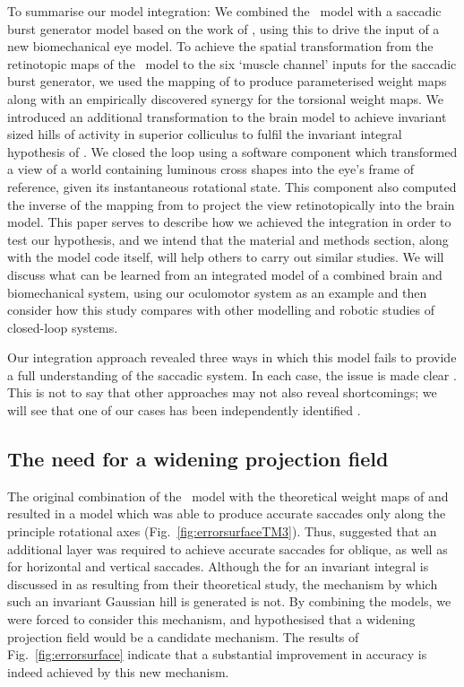 \documentclass{frontiersSCNS}
\begin{document}
To summarise our model integration: We combined
the \ccg~model \citep{cope_basal_2017} with a saccadic burst generator
model based on the work of \cite{gancarz_neural_1998}, using this to
drive the input of a new biomechanical eye model. To achieve the
spatial transformation from the retinotopic maps of the \ccg~model to
the six `muscle channel' inputs for the saccadic burst generator, we
used the mapping of \cite{ottes_visuomotor_1986} to produce
parameterised weight maps along with an empirically discovered synergy
for the torsional weight maps. We introduced an additional
transformation to the brain model to achieve invariant sized hills of
activity in superior colliculus to fulfil the invariant integral
hypothesis of \cite{tabareau_geometry_2007}. We closed the loop using
a software component which transformed a view of a world containing
luminous cross shapes into the eye's frame of reference, given its
instantaneous rotational state. This component also computed the
inverse of the mapping from \cite{ottes_visuomotor_1986} to project
the view retinotopically into the brain model.
%
This paper serves to describe how we achieved the integration in order
to test our hypothesis, and we intend that the material and methods
section, along with the model code itself, will help others to carry
out similar studies. We will discuss what can be learned from an
integrated model of a combined brain and biomechanical system, using
our oculomotor system as an example and then consider how this study
compares with other modelling and robotic studies of closed-loop
systems.

Our integration approach revealed three ways in which this model fails
to provide a full understanding of the saccadic system. In each case,
the issue is made clear . This is
not to say that other approaches may not also reveal shortcomings; we
will see that one of our cases has been independently identified
\citep{groh_effects_2011}.

\subsection{The need for a widening projection field}

The original combination of the \ccg~model with the theoretical weight
maps of \cite{ottes_visuomotor_1986} and \cite{tabareau_geometry_2007}
resulted in a model which was able to produce accurate saccades only
along the principle rotational axes
(Fig.~\ref{fig:errorsurfaceTM3}). Thus, 
suggested that an additional layer was required to achieve accurate
saccades for oblique, as well as for horizontal and vertical
saccades. Although the  for an invariant integral is discussed
in \cite{tabareau_geometry_2007} as resulting from their theoretical
study, the mechanism by which such an invariant Gaussian hill is
generated is not. By combining the models, we were forced to consider
this mechanism, and hypothesised that a widening projection field
would be a candidate mechanism. The results of Fig.~\ref{fig:errorsurface}
indicate that a substantial improvement in accuracy is indeed achieved
by this new mechanism.
\end{document}

